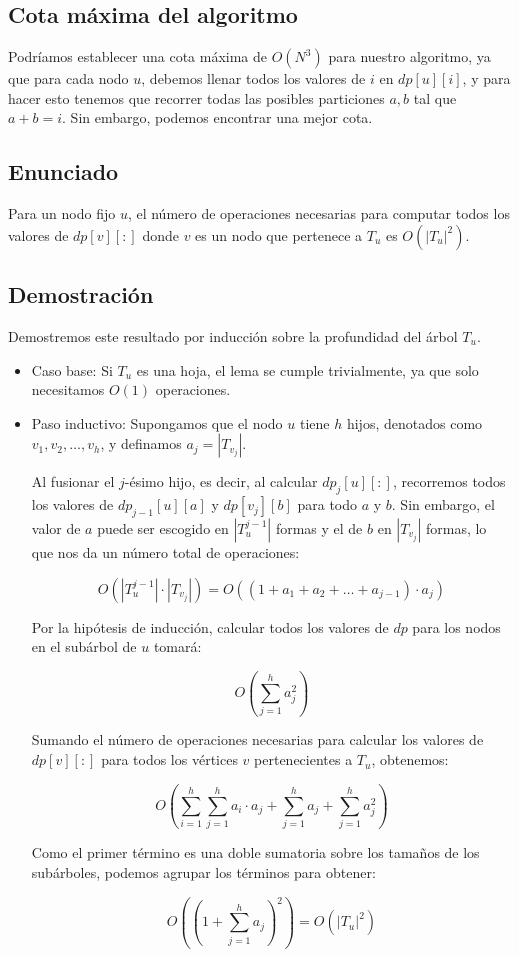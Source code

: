 \documentclass[12pt]{article}
\begin{document}
\subsection{Cota máxima del algoritmo}

Podríamos establecer una cota máxima de $O(N^3)$ para nuestro algoritmo, ya que para cada nodo $u$,
debemos llenar todos los valores de $i$ en $dp[u][i]$, y para hacer esto tenemos que recorrer todas las posibles
particiones $a, b$ tal que $a + b = i$. Sin embargo, podemos encontrar una mejor cota.

\subsection{Enunciado}

Para un nodo fijo $u$, el número de operaciones necesarias para computar todos los valores de 
$dp[v][:]$ donde $v$ es un nodo que pertenece a $T_u$ es $O(|T_u|^2)$.

\subsection{Demostración}

Demostremos este resultado por inducción sobre la profundidad del árbol $T_u$. 

\begin{itemize}
    \item Caso base: Si $T_u$ es una hoja, el lema se cumple trivialmente, ya que solo necesitamos $O(1)$ operaciones.
    \item Paso inductivo: Supongamos que el nodo $u$ tiene $h$ hijos, denotados como $v_1, v_2, \dots, v_h$, y definamos $a_j = |T_{v_j}|$.
    
    Al fusionar el $j$-ésimo hijo, es decir, al calcular $dp_j[u][:]$, recorremos todos los valores de $dp_{j-1}[u][a]$ y 
    $dp[v_j][b]$ para todo $a$ y $b$. Sin embargo, el valor de $a$ puede ser escogido en $|T_u^{j-1}|$ formas y el de $b$ en 
    $|T_{v_j}|$ formas, lo que nos da un número total de operaciones:

    \[
    O(|T_u^{j-1}| \cdot |T_{v_j}|) = O\left( (1 + a_1 + a_2 + \dots + a_{j-1}) \cdot a_j \right)
    \]

    Por la hipótesis de inducción, calcular todos los valores de $dp$ para los nodos en el subárbol de $u$ tomará:

    \[
    O\left( \sum_{j=1}^{h} a_j^2 \right)
    \]

    Sumando el número de operaciones necesarias para calcular los valores de $dp[v][:]$ para todos los vértices $v$ pertenecientes a $T_u$, obtenemos:

    \[
    O\left( \sum_{i=1}^{h} \sum_{j=1}^{h} a_i \cdot a_j + \sum_{j=1}^{h} a_j + \sum_{j=1}^{h} a_j^2 \right)
    \]

    Como el primer término es una doble sumatoria sobre los tamaños de los subárboles, podemos agrupar los términos para obtener:

    \[
    O\left( \left( 1 + \sum_{j=1}^{h} a_j \right)^2 \right) = O(|T_u|^2)
    \]

\end{itemize}
\end{document}
